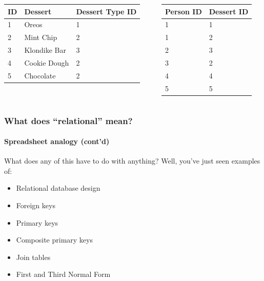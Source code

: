 \documentclass[aspectratio=169]{beamer}
\begin{document}
\begin{frame}
  \begin{columns}[T]
    \begin{column}{0.3\textwidth}
      \begin{table}[]
        \tiny
        \begin{tabular}{@{}llp{5em}@{}}
          \toprule
          ID & Dessert      & Dessert Type ID \\ \midrule
          1  & Oreos        & 1               \\
          2  & Mint Chip    & 2               \\
          3  & Klondike Bar & 3               \\
          4  & Cookie Dough & 2               \\
          5  & Chocolate    & 2               \\ \bottomrule
        \end{tabular}
      \end{table}
    \end{column}
    \begin{column}{0.5\textwidth}
      \begin{table}[]
        \tiny
        \begin{tabular}{@{}ll@{}}
          \toprule
          Person ID & Dessert ID \\ \midrule
          1         & 1          \\
          1         & 2          \\
          2         & 3          \\
          3         & 2          \\
          4         & 4          \\
          5         & 5          \\ \bottomrule
        \end{tabular}
      \end{table}
    \end{column}
  \end{columns}
\end{frame}

\begin{frame}
  \frametitle{What does ``relational'' mean?}
  \framesubtitle{Spreadsheet analogy (cont'd)}

  What does any of this have to do with anything? Well, you've just seen
  examples of:

  \begin{itemize}
    \item Relational database design
    \item Foreign keys
    \item Primary keys
    \item Composite primary keys
    \item Join tables
    \item First and Third Normal Form
  \end{itemize}
\end{frame}
\end{document}
